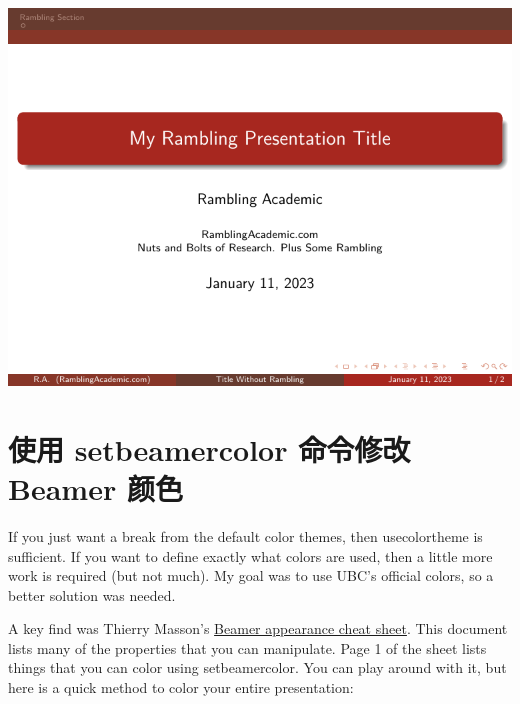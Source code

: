 \begin{column}{0.5\textwidth}
\includegraphics[page=2]{examples/beamer/beamercolor01.pdf}

\section{使用 {\ttfamily setbeamercolor} 命令修改 Beamer 颜色}

If you just want a break from the default color themes, then {\ttfamily usecolortheme} is sufficient. If you want to define exactly what colors are used, then a little more work is required (but not much). My goal was to use UBC’s official colors, so a better solution was needed.

A key find was Thierry Masson’s \href{http://www.cpt.univ-mrs.fr/~masson/latex/Beamer-appearance-cheat-sheet.pdf}{Beamer appearance cheat sheet}. This document lists many of the properties that you can manipulate. Page 1 of the sheet lists things that you can color using {\ttfamily setbeamercolor}. You can play around with it, but here is a quick method to color your entire presentation:


\end{column}
